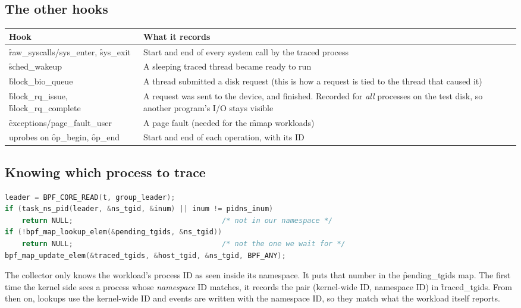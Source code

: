 \documentclass[11pt]{article}
\begin{document}
\subsection{The other hooks}
\begin{center}
\begin{tabularx}{\textwidth}{@{}lY@{}}
\toprule
Hook & What it records \\
\midrule
\f{raw\_syscalls/sys\_enter}, \f{sys\_exit} & Start and end of every system call by the traced process \\
\f{sched\_wakeup} & A sleeping traced thread became ready to run \\
\f{block\_bio\_queue} & A thread submitted a disk request (this is how a request is tied to the thread that caused it) \\
\f{block\_rq\_issue}, \f{block\_rq\_complete} & A request was sent to the device, and finished. Recorded for \emph{all} processes on the test disk, so another program's I/O stays visible \\
\f{exceptions/page\_fault\_user} & A page fault (needed for the \f{mmap} workloads) \\
uprobes on \f{op\_begin}, \f{op\_end} & Start and end of each operation, with its ID \\
\bottomrule
\end{tabularx}
\end{center}

\subsection{Knowing which process to trace}
\begin{lstlisting}[language=C]
leader = BPF_CORE_READ(t, group_leader);
if (task_ns_pid(leader, &ns_tgid, &inum) || inum != pidns_inum)
	return NULL;                                   /* not in our namespace */
if (!bpf_map_lookup_elem(&pending_tgids, &ns_tgid))
	return NULL;                                   /* not the one we wait for */
bpf_map_update_elem(&traced_tgids, &host_tgid, &ns_tgid, BPF_ANY);
\end{lstlisting}
The collector only knows the workload's process ID as seen inside its namespace. It puts that number in the \f{pending\_tgids} map. The first time the kernel side sees a process whose \emph{namespace} ID matches, it records the pair (kernel-wide ID, namespace ID) in \f{traced\_tgids}. From then on, lookups use the kernel-wide ID and events are written with the namespace ID, so they match what the workload itself reports.
\end{document}
